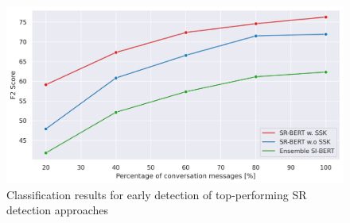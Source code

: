 \documentclass[letterpaper]{article} %
\begin{document}
\label{ExplicitLex}
\begin{figure}[]
\centering
\includegraphics[width=1.04\columnwidth]{figures/normal_F2.png}
\caption{Classification results for early detection of top-performing SR detection approaches}
\label{fig:Early detection}
\end{figure}
\end{document}
